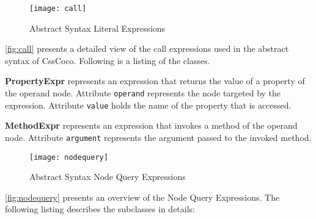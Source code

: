 \begin{figure}[h]
  \centering
  \caption{Abstract Syntax Literal Expressions}
  \label{fig:call}
  \texttt{[image: call]}
\end{figure}

\autoref{fig:call} presents a detailed view of the call expressions used in the abstract syntax of CssCoco. Following is a listing of the classes. 

\begin{description}

\item\textbf{PropertyExpr} represents an expression that returns the value of a property of the operand node. Attribute \texttt{operand} represents the node targeted by the expression. Attribute \texttt{value} holds the name of the property that is accessed.

\item\textbf{MethodExpr} represents an expression that invokes a method of the operand node. Attribute \texttt{argument} represents the argument passed to the invoked method.

\end{description}

\begin{figure}[h]
  \centering
  \caption{Abstract Syntax Node Query Expressions}
  \label{fig:nodequery}
  \texttt{[image: nodequery]}
\end{figure}

\autoref{fig:nodequery} presents an overview of the Node Query Expressions. The following listing describes the subclasses in details:

